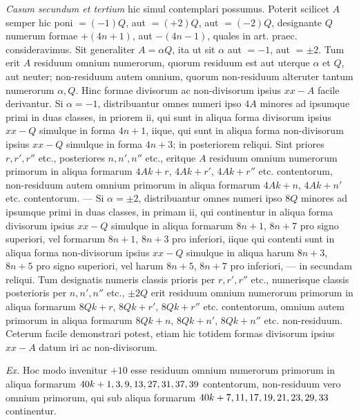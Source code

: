 \textit{Casum secundum et tertium} hic simul contemplari possumus. Poterit scilicet $A$ semper hic poni $=(-1)Q$, aut $=(+2)Q$, aut $=(-2)Q$, designante $Q$ numerum formae $+(4n+1)$, aut $-(4n-1)$, quales in art. praec. consideravimus. Sit generaliter $A=\alpha Q$, ita ut sit $\alpha$ aut $=-1$, aut $=\pm2$. Tum erit $A$ residuum omnium numerorum, quorum residuum est aut uterque $\alpha$ et $Q$, aut neuter; non-residuum autem omnium, quorum non-residuum alteruter tantum numerorum $\alpha,Q$. Hinc formae divisorum ac non-divisorum ipsius $xx-A$ facile derivantur. Si $\alpha=-1$, distribuantur omnes numeri ipso $4A$ minores ad ipsumque primi in duas classes, in priorem ii, qui sunt in aliqua forma divisorum ipsius $xx-Q$ simulque in forma $4n+1$, iique, qui sunt in aliqua forma non-divisorum ipsius $xx-Q$ simulque in forma $4n+3$; in posteriorem reliqui. Sint priores $r,r',r''$ etc., posteriores $n,n',n''$ etc., eritque $A$ residuum omnium numerorum primorum in aliqua formarum $4Ak+r$, $4Ak+r'$, $4Ak+r''$ etc. contentorum, non-residuum autem omnium primorum in aliqua formarum $4Ak+n$, $4Ak+n'$ etc. contentorum. --- Si $\alpha=\pm2$, distribuantur omnes numeri ipso $8Q$ minores ad ipsumque primi in duas classes, in primam ii, qui continentur in aliqua forma divisorum ipsius $xx-Q$ simulque in aliqua formarum $8n+1$, $8n+7$ pro signo superiori, vel formarum $8n+1$, $8n+3$ pro inferiori, iique qui contenti sunt in aliqua forma non-divisorum ipsius $xx-Q$ simulque in aliqua harum $8n+3$, $8n+5$ pro signo superiori, vel harum $8n+5$, $8n+7$ pro inferiori, --- in secundam reliqui. Tum designatis numeris classis prioris per $r,r',r''$ etc., numerisque classis posterioris per $n,n',n''$ etc., $\pm2Q$ erit residuum omnium numerorum primorum in aliqua formarum $8Qk+r$, $8Qk+r'$, $8Qk+r''$ etc. contentorum, omnium autem primorum in aliqua formarum $8Qk+n$, $8Qk+n'$, $8Qk+n''$ etc. non-residuum. Ceterum facile demonstrari potest, etiam hic totidem formas divisorum ipsius $xx-A$ datum iri ac non-divisorum.

\textit{Ex.} Hoc modo invenitur $+10$ esse residuum omnium numerorum primorum in aliqua formarum $40k+\nobreak{}1,\allowbreak{}3,\allowbreak{}9,\allowbreak{}13,\allowbreak{}27,\allowbreak{}31,\allowbreak{}37,\allowbreak{}39$ contentorum, non-residuum vero omnium primorum, qui sub aliqua formarum $40k+\nobreak{}7,\allowbreak{}11,\allowbreak{}17,\allowbreak{}19,\allowbreak{}21,\allowbreak{}23,\allowbreak{}29,\allowbreak{}33$ continentur.
\par\endgroup
